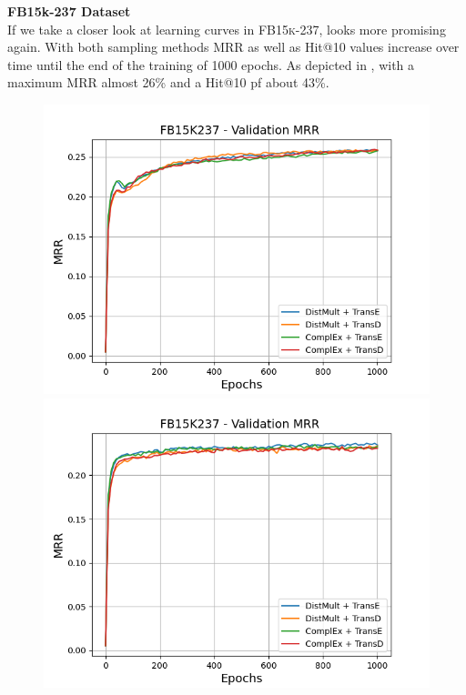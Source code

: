 \textbf{FB15k-237 Dataset}
\label{subsubsec:uncertainty_fb15k237}\\
%
If we take a closer look at learning curves in \textsc{FB15k-237}, \ussoftmax looks more promising again.
With both sampling methods MRR as well as Hit@10 values increase over time until the end of the training of 1000 epochs.
As depicted in , with \origsampling a maximum MRR almost 26\% and a Hit@10 pf about 43\%.
\begin{figure}[H]
    \centering
    \begin{minipage}{.5\textwidth}
      \centering
      \includegraphics[width=0.9\linewidth]{figures/results/gan_train/not_pretrained/random/fb15k237/epochs1000/random_fb15k237_mrrs.png}
    \end{minipage}%
    \begin{minipage}{.5\textwidth}
      \centering
      \includegraphics[width=0.9\linewidth]{figures/results/gan_train/not_pretrained/uncertainty/max_distribution/entropy/fb15k237/1k_epochs/uncertainty_fb15k237_mrrs.png}

\end{minipage}
\end{figure}
